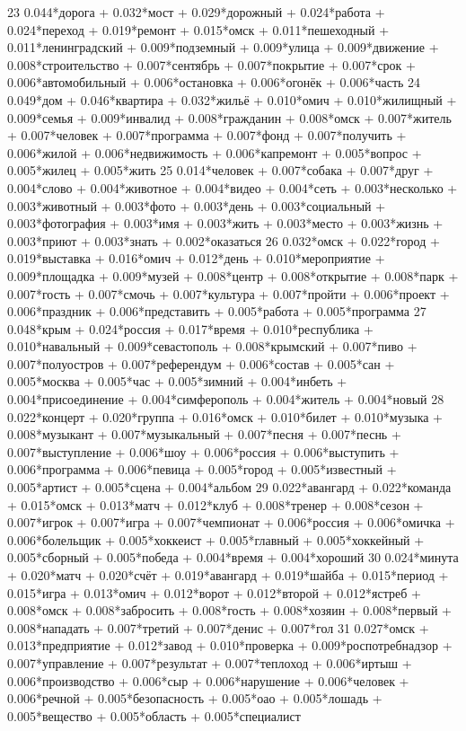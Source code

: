 23 0.044*дорога + 0.032*мост + 0.029*дорожный + 0.024*работа + 0.024*переход + 0.019*ремонт + 0.015*омск + 0.011*пешеходный + 0.011*ленинградский + 0.009*подземный + 0.009*улица + 0.009*движение + 0.008*строительство + 0.007*сентябрь + 0.007*покрытие + 0.007*срок + 0.006*автомобильный + 0.006*остановка + 0.006*огонёк + 0.006*часть
24 0.049*дом + 0.046*квартира + 0.032*жильё + 0.010*омич + 0.010*жилищный + 0.009*семья + 0.009*инвалид + 0.008*гражданин + 0.008*омск + 0.007*житель + 0.007*человек + 0.007*программа + 0.007*фонд + 0.007*получить + 0.006*жилой + 0.006*недвижимость + 0.006*капремонт + 0.005*вопрос + 0.005*жилец + 0.005*жить
25 0.014*человек + 0.007*собака + 0.007*друг + 0.004*слово + 0.004*животное + 0.004*видео + 0.004*сеть + 0.003*несколько + 0.003*животный + 0.003*фото + 0.003*день + 0.003*социальный + 0.003*фотография + 0.003*имя + 0.003*жить + 0.003*место + 0.003*жизнь + 0.003*приют + 0.003*знать + 0.002*оказаться
26 0.032*омск + 0.022*город + 0.019*выставка + 0.016*омич + 0.012*день + 0.010*мероприятие + 0.009*площадка + 0.009*музей + 0.008*центр + 0.008*открытие + 0.008*парк + 0.007*гость + 0.007*смочь + 0.007*культура + 0.007*пройти + 0.006*проект + 0.006*праздник + 0.006*представить + 0.005*работа + 0.005*программа
27 0.048*крым + 0.024*россия + 0.017*время + 0.010*республика + 0.010*навальный + 0.009*севастополь + 0.008*крымский + 0.007*пиво + 0.007*полуостров + 0.007*референдум + 0.006*состав + 0.005*сан + 0.005*москва + 0.005*час + 0.005*зимний + 0.004*инбеть + 0.004*присоединение + 0.004*симферополь + 0.004*житель + 0.004*новый
28 0.022*концерт + 0.020*группа + 0.016*омск + 0.010*билет + 0.010*музыка + 0.008*музыкант + 0.007*музыкальный + 0.007*песня + 0.007*песнь + 0.007*выступление + 0.006*шоу + 0.006*россия + 0.006*выступить + 0.006*программа + 0.006*певица + 0.005*город + 0.005*известный + 0.005*артист + 0.005*сцена + 0.004*альбом
29 0.022*авангард + 0.022*команда + 0.015*омск + 0.013*матч + 0.012*клуб + 0.008*тренер + 0.008*сезон + 0.007*игрок + 0.007*игра + 0.007*чемпионат + 0.006*россия + 0.006*омичка + 0.006*болельщик + 0.005*хоккеист + 0.005*главный + 0.005*хоккейный + 0.005*сборный + 0.005*победа + 0.004*время + 0.004*хороший
30 0.024*минута + 0.020*матч + 0.020*счёт + 0.019*авангард + 0.019*шайба + 0.015*период + 0.015*игра + 0.013*омич + 0.012*ворот + 0.012*второй + 0.012*ястреб + 0.008*омск + 0.008*забросить + 0.008*гость + 0.008*хозяин + 0.008*первый + 0.008*нападать + 0.007*третий + 0.007*денис + 0.007*гол
31 0.027*омск + 0.013*предприятие + 0.012*завод + 0.010*проверка + 0.009*роспотребнадзор + 0.007*управление + 0.007*результат + 0.007*теплоход + 0.006*иртыш + 0.006*производство + 0.006*сыр + 0.006*нарушение + 0.006*человек + 0.006*речной + 0.005*безопасность + 0.005*оао + 0.005*лошадь + 0.005*вещество + 0.005*область + 0.005*специалист
